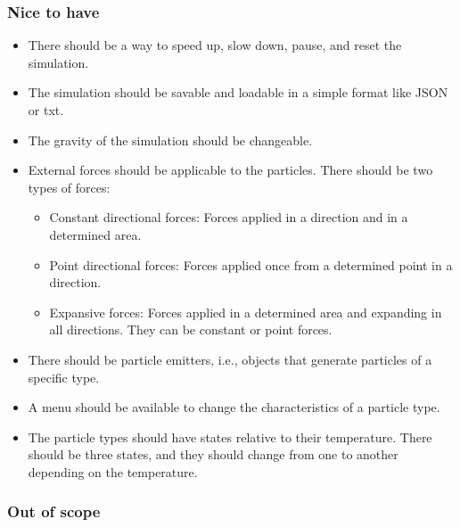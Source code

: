 \documentclass{article}
\begin{document}
\subsubsection{Nice to have}

\begin{itemize}
    \item There should be a way to speed up, slow down, pause, and reset the simulation.
    \item The simulation should be savable and loadable in a simple format like JSON or txt.
    \item The gravity of the simulation should be changeable.
    \item External forces should be applicable to the particles. There should be two types of forces:
    \begin{itemize}
        \item Constant directional forces: Forces applied in a direction and in a determined area.
        \item Point directional forces: Forces applied once from a determined point in a direction.
        \item Expansive forces: Forces applied in a determined area and expanding in all directions. They can be constant or point forces.
    \end{itemize}
    \item There should be particle emitters, i.e., objects that generate particles of a specific type.
    \item A menu should be available to change the characteristics of a particle type.
    \item The particle types should have states relative to their temperature. There should be three states, and they should change from one to another depending on the temperature.
\end{itemize}

\subsubsection{Out of scope}
\end{document}
